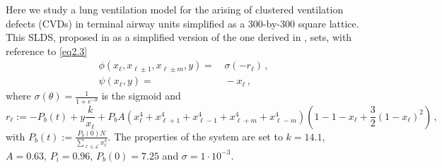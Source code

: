 \documentclass[../main.tex]{subfiles}
\begin{document}
\begin{example}[label=ex2.2]{}{}
     Here we study a lung ventilation model for the arising of clustered ventilation defects (CVDs) in terminal airway units simplified as a $300$-by-$300$ square lattice. This SLDS, proposed in \cite{Donovan22} as a simplified version of the one derived in \cite{Donovan15}, sets, with reference to \eqref{eq2.3}
     \begin{align}
             \phi(x_{\ell}, x_{\ell\pm1},x_{\ell\pm m},y) =&\, \sigma(-r_{\ell})\,, \nonumber \\
            \psi(x_{\ell},y) =&\,-x_{\ell} \,,\nonumber
     \end{align}
     where $\sigma(\theta)=\frac{1}{1+e^{-\theta}}$ is the sigmoid and 
     $$r_{\ell}:=-P_{b}(t)+y \frac{k}{x_{\ell}}+P_{b}A(x_{\ell}^{4}+x_{\ell+1}^{4}+x_{\ell-1}^{4}+x_{\ell+m}^{4}+x_{\ell-m}^{4})(1 - 1 - x_{\ell}+ \frac{3}{2}(1-x_{\ell})^{2})\,,$$
     with $P_{b}(t):=\frac{P_{b}(0)N}{\sum_{\ell\in \mathcal{L}}^{}x_{\ell}^{4}}$. The properties of the system are set to $k=14.1$, $A=0.63$, $P_{i}=0.96$, $P_{b}(0)=7.25$ and $\sigma = 1\cdot 10^{-3}$.
\end{example}
\end{document}
